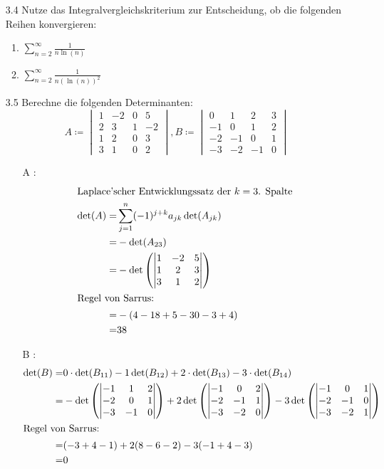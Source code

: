 \documentclass{HM}
\begin{document}
\begin{enumerate}
		\item[3.4] Nutze das Integralvergleichskriterium zur Entscheidung, ob die folgenden Reihen konvergieren:
		\begin{enumerate}
			\item $\sum\limits_{n=2}^\infty\frac{1}{n\ln(n)}$
			\item $\sum\limits_{n=2}^\infty\frac{1}{n(\ln(n))^2}$
		\end{enumerate}
		
		\item[3.5] Berechne die folgenden Determinanten:
		$$A\coloneqq\begin{vmatrix}
			1&-2&0&5\\
			2&3&1&-2\\
			1&2&0&3\\
			3&1&0&2
		\end{vmatrix},
		B\coloneqq\begin{vmatrix}
			0&1&2&3\\
			-1&0&1&2\\
			-2&-1&0&1\\
			-3&-2&-1&0
		\end{vmatrix}$$
		\begin{enumerate}
		\item[A]:
		\begin{align*}
			\intertext{Laplace'scher Entwicklungssatz der $k=3$. Spalte}
			\det(A)=&\sum\limits_{j=1}^n(-1)^{j+k}a_{jk}\det(A_{jk})\\
			=&-\det(A_{23})\\
			=&-\det\left(\begin{vmatrix}
				1&-2&5\\
				1&2&3\\
				3&1&2
			\end{vmatrix}\right)\\
			\intertext{Regel von Sarrus:}
			=&-(4-18+5-30-3+4)\\
			=&38
		\end{align*}
		\item [B]:
		\begin{align*}
			\det(B)=&0\cdot\det(B_{11})-1\det(B_{12})+2\cdot\det(B_{13})-3\cdot\det(B_{14})\\
			=&-\det\left(\begin{vmatrix}
				-1&1&2\\
				-2&0&1\\
				-3&-1&0
			\end{vmatrix}\right)
			+2\det\left(\begin{vmatrix}
				-1&0&2\\
				-2&-1&1\\
				-3&-2&0
			\end{vmatrix}\right)
			-3\det\left(\begin{vmatrix}
				-1&0&1\\
				-2&-1&0\\
				-3&-2&1
			\end{vmatrix}\right)\\
			\intertext{Regel von Sarrus:}
			=&(-3+4-1)+2(8-6-2)-3(-1+4-3)\\
			=&0
		\end{align*}
		\end{enumerate}
		

\end{enumerate}
\end{document}
